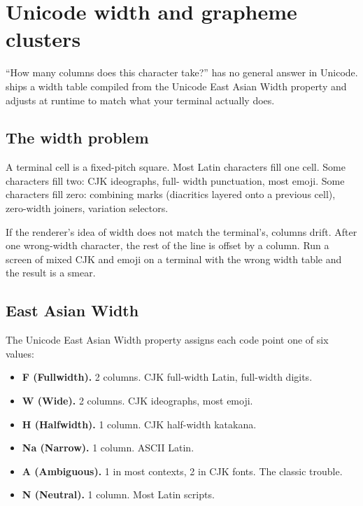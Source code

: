 \chapter{Unicode width and grapheme clusters}
\label{ch:width}

\begin{aside}
``How many columns does this character take?'' has no general
answer in Unicode. \maya{} ships a width table compiled from the
Unicode East Asian Width property and adjusts at runtime to match
what your terminal actually does.
\end{aside}

\section{The width problem}

A terminal cell is a fixed-pitch square. Most Latin characters
fill one cell. Some characters fill two: CJK ideographs, full-
width punctuation, most emoji. Some characters fill zero: combining
marks (diacritics layered onto a previous cell), zero-width
joiners, variation selectors.

If the renderer's idea of width does not match the terminal's,
columns drift. After one wrong-width character, the rest of the
line is offset by a column. Run a screen of mixed CJK and emoji on
a terminal with the wrong width table and the result is a smear.

\section{East Asian Width}

The Unicode East Asian Width property assigns each code point one
of six values:

\begin{itemize}[leftmargin=*]
  \item \textbf{F (Fullwidth).} 2 columns. CJK full-width Latin,
    full-width digits.
  \item \textbf{W (Wide).} 2 columns. CJK ideographs, most
    emoji.
  \item \textbf{H (Halfwidth).} 1 column. CJK half-width katakana.
  \item \textbf{Na (Narrow).} 1 column. ASCII Latin.
  \item \textbf{A (Ambiguous).} 1 in most contexts, 2 in CJK
    fonts. The classic trouble.
  \item \textbf{N (Neutral).} 1 column. Most Latin scripts.
\end{itemize}

